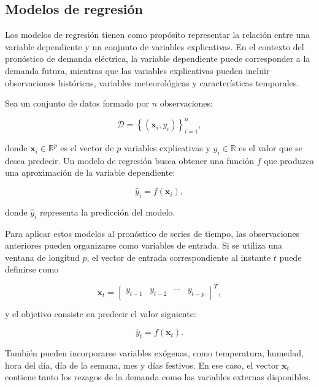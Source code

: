 \subsection{Modelos de regresión}
\label{sec:modelos_regresion}

Los modelos de regresión tienen como propósito representar la relación entre una variable dependiente y un conjunto de variables explicativas. En el contexto del pronóstico de demanda eléctrica, la variable dependiente puede corresponder a la demanda futura, mientras que las variables explicativas pueden incluir observaciones históricas, variables meteorológicas y características temporales.

Sea un conjunto de datos formado por $n$ observaciones:

\begin{equation}
    \mathcal{D}
    =
    \left\{
        \left(\mathbf{x}_i,y_i\right)
    \right\}_{i=1}^{n},
\end{equation}

donde $\mathbf{x}_i\in\mathbb{R}^{p}$ es el vector de $p$ variables explicativas y $y_i\in\mathbb{R}$ es el valor que se desea predecir. Un modelo de regresión busca obtener una función $f$ que produzca una aproximación de la variable dependiente:

\begin{equation}
    \hat{y}_i=f(\mathbf{x}_i),
\end{equation}

donde $\hat{y}_i$ representa la predicción del modelo.

Para aplicar estos modelos al pronóstico de series de tiempo, las observaciones anteriores pueden organizarse como variables de entrada. Si se utiliza una ventana de longitud $p$, el vector de entrada correspondiente al instante $t$ puede definirse como

\begin{equation}
    \mathbf{x}_t=
    \begin{bmatrix}
        y_{t-1} &
        y_{t-2} &
        \cdots &
        y_{t-p}
    \end{bmatrix}^{T},
\end{equation}

y el objetivo consiste en predecir el valor siguiente:

\begin{equation}
    \hat{y}_t=f(\mathbf{x}_t).
\end{equation}

También pueden incorporarse variables exógenas, como temperatura, humedad, hora del día, día de la semana, mes y días festivos. En ese caso, el vector $\mathbf{x}_t$ contiene tanto los rezagos de la demanda como las variables externas disponibles.

